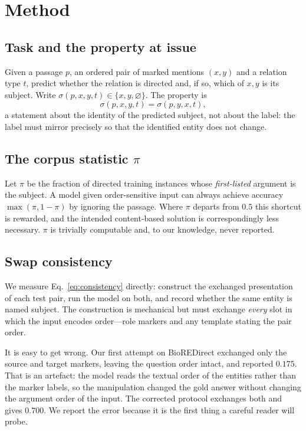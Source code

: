 \documentclass[11pt]{article}
\begin{document}
\section{Method}
\label{sec:method}

\subsection{Task and the property at issue}
\label{sec:method-task}
Given a passage $p$, an ordered pair of marked mentions $(x, y)$ and a relation type $t$,
predict whether the relation is directed and, if so, which of $x, y$ is its subject. Write
$\sigma(p, x, y, t) \in \{x, y, \varnothing\}$. The property is
\begin{equation}
\sigma(p, x, y, t) = \sigma(p, y, x, t),
\label{eq:consistency}
\end{equation}
a statement about the identity of the predicted subject, not about the label: the label must
mirror precisely so that the identified entity does not change.

\subsection{The corpus statistic $\pi$}
\label{sec:method-pi}
Let $\pi$ be the fraction of directed training instances whose \emph{first-listed} argument is
the subject. A model given order-sensitive input can always achieve accuracy
$\max(\pi, 1-\pi)$ by ignoring the passage. Where $\pi$ departs from $0.5$ this shortcut is
rewarded, and the intended content-based solution is correspondingly less necessary. $\pi$ is
trivially computable and, to our knowledge, never reported.

\subsection{Swap consistency}
\label{sec:method-metric}
We measure Eq.~\ref{eq:consistency} directly: construct the exchanged presentation of each test
pair, run the model on both, and record whether the same entity is named subject. The
construction is mechanical but must exchange \emph{every} slot in which the input encodes
order---role markers and any template stating the pair order.

It is easy to get wrong. Our first attempt on BioREDirect exchanged only the source and target
markers, leaving the question order intact, and reported $0.175$. That is an artefact: the
model reads the textual order of the entities rather than the marker labels, so the
manipulation changed the gold answer without changing the argument order of the input. The
corrected protocol exchanges both and gives $0.700$. We report the error because it is the
first thing a careful reader will probe.
\end{document}
